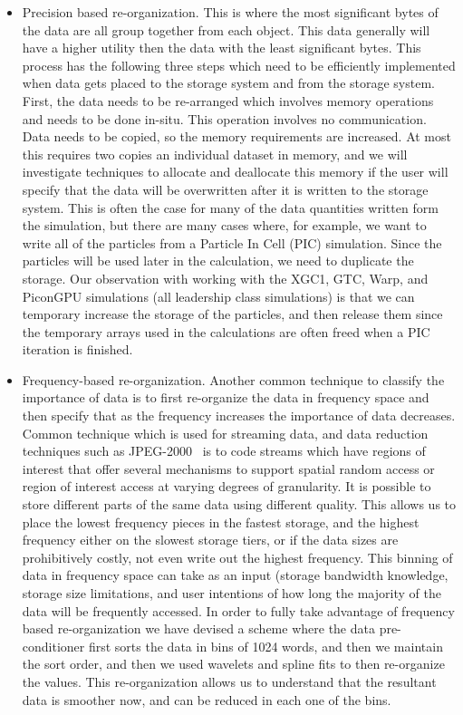 \begin{itemize} 
	
\item Precision based re-organization. This is where the most significant bytes
	of the data are all group together from each object. This data
	generally will have a higher utility then the data with the least
	significant bytes.  This process has the following three steps which
	need to be efficiently implemented when data gets placed to the storage
	system and from the storage system.  First, the data needs to be
	re-arranged which involves memory operations and needs to be done
	in-situ. This operation involves no communication.  Data needs to be
	copied, so the memory requirements are increased. At most this requires
	two copies an individual dataset in memory, and we will investigate
	techniques to allocate and deallocate this memory if the user will
	specify that the data will be overwritten after it is written to the
	storage system. This is often the case for many of the data quantities
	written form the simulation, but there are many cases where, for
	example, we want to write all of the particles from a Particle In Cell
	(PIC) simulation.  Since the particles will be used later in the
	calculation, we need to duplicate the storage. Our observation with
	working with the XGC1, GTC, Warp, and PiconGPU simulations (all
	leadership class simulations) is that we can temporary increase the
	storage of the particles, and then release them since the temporary
	arrays used in the calculations are often freed when a PIC iteration is
	finished. 
%
\item Frequency-based re-organization.  Another common technique to classify
	the importance of data is to first re-organize the data in frequency
	space and then specify that as the frequency increases the importance
	of data decreases.   Common technique which is used for streaming data,
	and data reduction techniques such as JPEG-2000~\cite{jpeg2000} is to
	code streams which have regions of interest that offer several
	mechanisms to support spatial random access or region of interest
	access at varying degrees of granularity. It is possible to store
	different parts of the same data using different quality.  This allows
	us to place the lowest frequency pieces in the fastest storage, and the
	highest frequency either on the slowest storage tiers, or if the data
	sizes are prohibitively  costly, not even write out the highest
	frequency. This binning of data in frequency space can take as an input
	(storage bandwidth knowledge, storage size limitations, and user
	intentions of how long the majority of the data will be frequently
	accessed.  In order to fully take advantage of frequency based
	re-organization we have devised a scheme where the data pre-conditioner
	first sorts the data in bins of 1024 words, and then we maintain the
	sort order, and then we used wavelets and spline fits to then
	re-organize the values.  This re-organization allows us to understand
	that the resultant data is smoother now, and can be reduced in each one
	of the bins.  \end{itemize}

